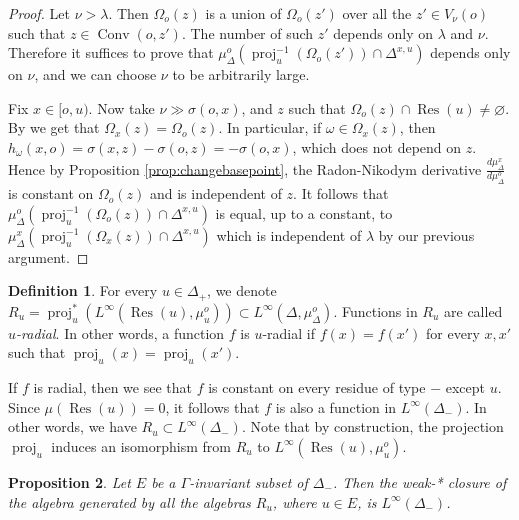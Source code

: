 \documentclass[a4paper, 11pt]{article}
\theoremstyle{plain}
\newtheorem{proposition}{Proposition}[section]
\theoremstyle{definition}
\newtheorem{definition}[proposition]{Definition}
\theoremstyle{remark}
\DeclareMathOperator{\Conv}{Conv}
\DeclareMathOperator{\proj}{proj}
\DeclareMathOperator{\Res}{Res}
\begin{document}
\begin{proof}
 Let $\nu>\lambda$. Then $\Omega_o(z)$ is a union of $\Omega_o(z')$ over all the $z'\in V_\nu(o)$ such that $z\in \Conv(o,z')$. The number of such $z'$ depends only on $\lambda$ and $\nu$. Therefore it suffices to prove that $\mu_\Delta^o(\proj_u^{-1}(\Omega_o(z'))\cap \Delta^{x,u})$ depends only on $\nu$, and we can choose $\nu$ to be arbitrarily large.

Fix $x\in [o,u)$.
Now take $\nu\gg \sigma(o,x)$, and $z$ such that $\Omega_o(z)\cap \Res(u)\neq \varnothing$. By \cite[Theorem 3.6]{Parkinson} we get that $\Omega_x(z) = \Omega_o(z)$. In particular, if $\omega\in\Omega_x(z)$, then $h_\omega(x,o)=\sigma(x,z)-\sigma(o,z)=-\sigma(o,x)$, which does not depend on $z$. Hence by Proposition \ref{prop:changebasepoint}, the Radon-Nikodym derivative $\frac{d\mu_\Delta^x}{d\mu_\Delta^o}$ is constant on $\Omega_o(z)$ and is independent of $z$.
  It follows that $\mu_\Delta^o(\proj_u^{-1}(\Omega_o(z))\cap \Delta^{x,u})$ is equal, up to a constant, to $\mu_\Delta^x(\proj_u^{-1}(\Omega_x(z))\cap \Delta^{x,u})$
which is independent of $\lambda$ by our previous argument. 

\end{proof}

\begin{definition}
For every $u\in \Delta_+$, we denote $R_u = \proj_u^*(L^\infty(\Res(u),\mu_u^o))\subset L^\infty(\Delta,\mu_\Delta^o)$. Functions in $R_u$ are called 
\emph{$u$-radial}. In other words, a function 
 $f$ is $u$-radial if $f(x)=f(x')$ for every $x,x'$ such that $\proj_u(x)=\proj_u(x')$.

\end{definition}



If $f$ is radial, then we see that $f$ is constant on every residue of type $-$ except $u$. Since $\mu(\Res(u))=0$, it follows that $f$ is also a function in $L^\infty(\Delta_-)$. In other words, we have $R_u\subset L^\infty(\Delta_-)$. Note that by construction, the projection $\proj_u$ induces an isomorphism from $R_u$ to $L^\infty(\Res(u),\mu_u^o)$.  


\begin{proposition}\label{rugenerate}
Let $E$ be a $\Gamma$-invariant subset of $\Delta_-$. Then the weak-* closure of the algebra generated by all the algebras $R_u$, where $u\in E$, is $L^\infty(\Delta_-)$.
\end{proposition}
\end{document}
